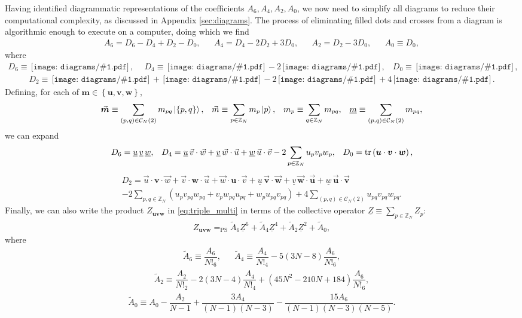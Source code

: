 \documentclass[nofootinbib,notitlepage,11pt]{revtex4-2}
\newcommand{\f}[2]{\dfrac{#1}{#2}} %
\newcommand{\p}[1]{\left(#1\right)} %
\renewcommand{\set}[1]{\left\{#1\right\}} %
\renewcommand{\c}{\cdot} %
\newcommand{\m}{\bm} %
\renewcommand{\v}{\vec} %
\newcommand{\1}{\mathds{1}}
\newcommand{\C}{\mathcal{C}}
\newcommand{\ZZ}{\mathbb{Z}}
\newcommand{\EQPS}{=_{\text{PS}}}
\newcommand{\col}{\underline}
\newcommand{\diagram}[1]
{\,\texttt{[image: diagrams/\#1.pdf]}\,}
\begin{document}
Having identified diagrammatic representations of the coefficients
$A_6,A_4,A_2,A_0$, we now need to simplify all diagrams to reduce
their computational complexity, as discussed in Appendix
\ref{sec:diagrams}.  The process of eliminating filled dots and
crosses from a diagram is algorithmic enough to execute on a computer,
doing which we find
\begin{align}
  A_6 = D_6 - D_4 + D_2 - D_0,
  &&
  A_4 = D_4 - 2 D_2 + 3 D_0,
  &&
  A_2 = D_2 - 3 D_0,
  &&
  A_0 \equiv D_0,
\end{align}
where
\begin{align}
  D_6 \equiv \diagram{triple_0_o},
  &&
  D_4 \equiv \diagram{triple_01_o} - 2 \diagram{triple_1_o},
  &&
  D_0 \equiv \diagram{triple_0111_o},
\end{align}
\begin{align}
  D_2 \equiv \diagram{triple_011_o}
  + \diagram{triple_02_o}
  - 2 \diagram{triple_11_o}
  + 4 \diagram{triple_2_o}.
\end{align}
Defining, for each of $\m m\in\set{\m u,\m v,\m w}$,
\begin{align}
  \v{\m m} \equiv \sum_{\p{p,q}\in\C_N\p{2}} m_{pq} \ket{\set{p,q}},
  &&
  \v m \equiv \sum_{p\in\ZZ_N} m_p \ket{p},
  &&
  m_p \equiv \sum_{q\in\ZZ_N} m_{pq},
  &&
  \col{m} \equiv \sum_{\p{p,q}\in\C_N\p{2}} m_{pq},
\end{align}
we can expand
\begin{align}
  D_6 = \col{u}\,\col{v}\,\col{w},
  &&
  D_4 = \col{u}\,\v v\c\v w + \col{v}\,\v w\c\v u
  + \col{w}\,\v u\c\v v - 2 \sum_{p\in\ZZ_N} u_p v_p w_p,
  &&
  D_0 = \tr\p{\m u \c \m v \c \m w},
\end{align}
\begin{multline}
  D_2 = \v u \c\m v\c\v w + \v v \c\m w\c\v u + \v w \c\m u\c\v v
  + \col{u}\,\v{\m v}\c\v{\m w} + \col{v}\,\v{\m w}\c\v{\m u}
  + \col{w}\,\v{\m u}\c\v{\m v} \\
  - 2 \sum_{p,q\in\ZZ_N} \p{u_p v_{pq} w_{pq}
    + v_p w_{pq} u_{pq} + w_p u_{pq} v_{pq}}
  + 4 \sum_{\p{p,q}\in\C_N\p{2}} u_{pq} v_{pq} w_{pq}.
\end{multline}
Finally, we can also write the product $Z_{\m u\m v\m w}$ in
\eqref{eq:triple_multi} in terms of the collective operator
$\col{Z} \equiv \sum_{p\in\ZZ_N} Z_p$:
\begin{align}
  Z_{\m u\m v\m w} \EQPS
  \tilde A_6 \col{Z}^6 + \tilde A_4 \col{Z}^4
  + \tilde A_2 \col{Z}^2 + \tilde A_0,
  \label{eq:triple_col}
\end{align}
where
\begin{align}
  \tilde A_6 \equiv \f{A_6}{N!_6},
  &&
  \tilde A_4 \equiv \f{A_4}{N!_4} - 5\p{3N-8} \f{A_6}{N!_6},
\end{align}
\begin{align}
  \tilde A_2 \equiv \f{A_2}{N!_2} - 2\p{3N-4} \f{A_4}{N!_4}
  + \p{45N^2-210N+184} \f{A_6}{N!_6},
\end{align}
\begin{align}
  \tilde A_0 \equiv A_0 - \f{A_2}{N-1}
  + \f{3A_4}{\p{N-1}\p{N-3}}
  - \f{15A_6}{\p{N-1}\p{N-3}\p{N-5}}.
\end{align}


\end{document}
